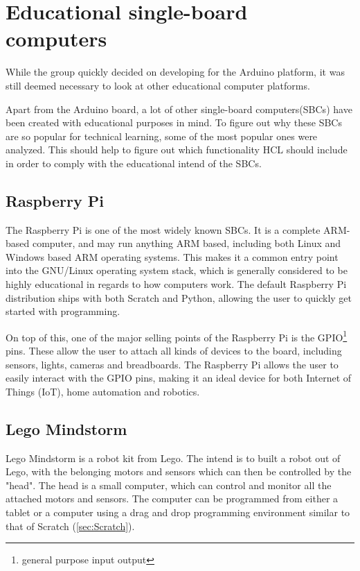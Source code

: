 \section{Educational single-board computers}
While the group quickly decided on developing for the Arduino platform, it was still deemed necessary to look at other educational computer platforms. 

Apart from the Arduino board, a lot of other single-board computers(SBCs) have been created with educational purposes in mind.
To figure out why these SBCs are so popular for technical learning, some of the most popular ones were analyzed.
This should help to figure out which functionality HCL should include in order to comply with the educational intend of the SBCs\cite{SBC}.

\subsection{Raspberry Pi}
The Raspberry Pi is one of the most widely known SBCs. 
It is a complete ARM-based computer, and may run anything ARM based, including both Linux and Windows based ARM operating systems. 
This makes it a common entry point into the GNU/Linux operating system stack, which is generally considered to be highly educational in regards to how computers work.
The default Raspberry Pi distribution ships with both Scratch and Python, allowing the user to quickly get started with programming\cite{RaspberryPi}.

On top of this, one of the major selling points of the Raspberry Pi is the GPIO\footnote{general purpose input output} pins. 
These allow the user to attach all kinds of devices to the board, including sensors, lights, cameras and breadboards. 
The Raspberry Pi allows the user to easily interact with the GPIO pins, making it an ideal device for both Internet of Things (IoT), home automation and robotics\cite{RaspberryPi}.

\subsection{Lego Mindstorm}
Lego Mindstorm is a robot kit from Lego. 
The intend is to built a robot out of Lego, with the belonging motors and sensors which can then be controlled by the "head". 
The head is a small computer, which can control and monitor all the attached motors and sensors. 
The computer can be programmed from either a tablet or a computer using a drag and drop programming environment similar to that of Scratch (\ref{sec:Scratch})\cite{LegoMindstorms}.

